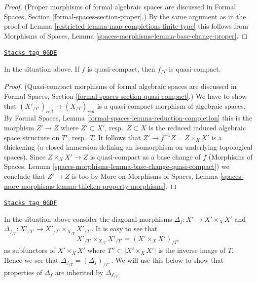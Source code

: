 \begin{proof}

(Proper morphisms of formal algebraic spaces are discussed in
Formal Spaces, Section \ref{formal-spaces-section-proper}.)
By the same argument as in the proof of
Lemma \ref{restricted-lemma-map-completions-finite-type} this follows from
Morphisms of Spaces, Lemma
\ref{spaces-morphisms-lemma-base-change-proper}.
\end{proof}

\begin{lemma}
\label{restricted-lemma-quasi-compact-gives-quasi-compact}
\href{https://stacks.math.columbia.edu/tag/0GDE}{\texttt{Stacks tag 0GDE}}

In the situation above. If $f$ is quasi-compact, then
$f_{/T}$ is quasi-compact.
\end{lemma}

\begin{proof}
(Quasi-compact morphisms of formal algebraic spaces are discussed in
Formal Spaces, Section \ref{formal-spaces-section-quasi-compact}.)
We have to show that $(X'_{/T'})_{red} \to (X_{/T})_{red}$ is a quasi-compact
morphism of algebraic spaces. By
Formal Spaces, Lemma \ref{formal-spaces-lemma-reduction-completion}
this is the morphism $Z' \to Z$ where $Z' \subset X'$, resp.\ $Z \subset X$
is the reduced induced algebraic space structure on $T'$, resp.\ $T$.
It follows that $Z' \to f^{-1}Z = Z \times_X X'$ is a thickening (a closed
immersion defining an isomorphism on underlying topological spaces).
Since $Z \times_X X' \to Z$ is quasi-compact as a base change of $f$
(Morphisms of Spaces, Lemma
\ref{spaces-morphisms-lemma-base-change-quasi-compact})
we conclude that $Z' \to Z$ is too by
More on Morphisms of Spaces, Lemma
\ref{spaces-more-morphisms-lemma-thicken-property-morphisms}.
\end{proof}

\begin{remark}
\label{restricted-remark-diagonal-gives-diagonal}
\href{https://stacks.math.columbia.edu/tag/0GDF}{\texttt{Stacks tag 0GDF}}

In the situation above consider the diagonal morphisms
$\Delta_f : X' \to X' \times_X X'$ and
$\Delta_{f_{/T}} : X'_{/T'} \to X'_{/T'} \times_{X_{/T}} X'_{/T'}$.
It is easy to see that
$$
X'_{/T'} \times_{X_{/T}} X'_{/T'} = (X' \times_X X')_{/T''}
$$
as subfunctors of $X' \times_X X'$ where $T'' \subset |X' \times_X X'|$
is the inverse image of $T$. Hence we see that
$\Delta_{f_{/T}} = (\Delta_f)_{/T''}$. We will use this below
to show that properties of $\Delta_f$ are inherited by $\Delta_{f_{/T}}$.
\end{remark}

